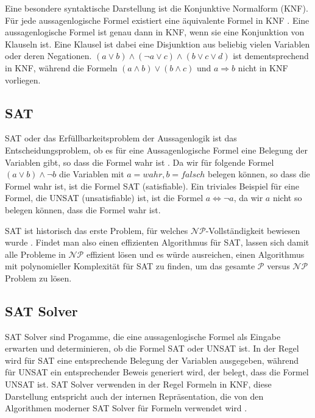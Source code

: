 \documentclass[conference,compsoc,final,a4paper]{IEEEtran}
\begin{document}
Eine besondere syntaktische Darstellung ist die Konjunktive Normalform (KNF). Für jede aussagenlogische Formel existiert eine äquivalente Formel in KNF \cite{anatomy_of_modern_sat_solvers}. Eine aussagenlogische Formel ist genau dann in KNF, wenn sie eine Konjunktion von Klauseln ist. Eine Klausel ist dabei eine Disjunktion aus beliebig vielen Variablen oder deren Negationen. $(a \lor b) \land (\neg a \lor c) \land (b \lor c \lor d)$ ist dementsprechend in KNF, während die Formeln $(a \land b) \lor (b \land c)$ und $a \Rightarrow b$ nicht in KNF vorliegen. \cite{aussagenlogik_rautenberg}

\subsection{SAT}
SAT oder das Erfüllbarkeitsproblem der Aussagenlogik ist das Entscheidungsproblem, ob es für eine Aussagenlogische Formel eine Belegung der Variablen gibt, so dass die Formel wahr ist \cite{theory_of_computing}. Da wir für folgende Formel $(a \lor b) \land \neg b$ die Variablen mit $a = wahr, b = falsch$ belegen können, so dass die Formel wahr ist, ist die Formel SAT (satisfiable). Ein triviales Beispiel für eine Formel, die UNSAT (unsatisfiable) ist, ist die Formel $a \Leftrightarrow \neg a$, da wir $a$ nicht so belegen können, dass die Formel wahr ist.

SAT ist historisch das erste Problem, für welches $\mathcal{NP}$-Vollständigkeit bewiesen wurde \cites{handbook_theoretical_computer_science,seed}. Findet man also einen effizienten Algorithmus für SAT, lassen sich damit alle Probleme in $\mathcal{NP}$ effizient lösen und es würde ausreichen, einen Algorithmus mit polynomieller Komplexität für SAT zu finden, um das gesamte $\mathcal{P}$ versus $\mathcal{NP}$ Problem zu lösen. %

\subsection{SAT Solver}
SAT Solver sind Progamme, die eine aussagenlogische Formel als Eingabe erwarten und determinieren, ob die Formel SAT oder UNSAT ist. In der Regel wird für SAT eine entsprechende Belegung der Variablen ausgegeben, während für UNSAT ein entsprechender Beweis generiert wird, der belegt, dass die Formel UNSAT ist. SAT Solver verwenden in der Regel Formeln in KNF, diese Darstellung entspricht auch der internen Repräsentation, die von den Algorithmen moderner SAT Solver für Formeln verwendet wird \cite{handbook_of_knowledge_representations}.
\end{document}
